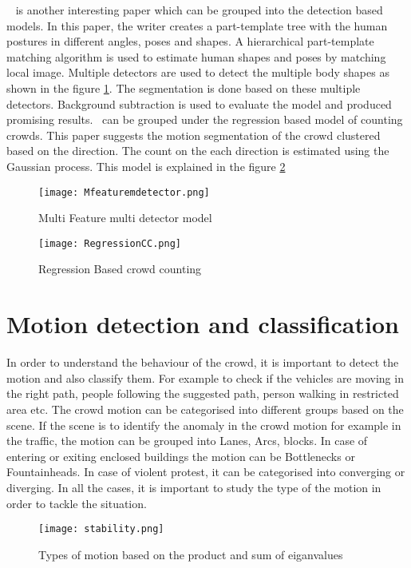 ~\cite{5374413} is another interesting paper which can be grouped into the detection based models. In 
this paper, the writer creates a part-template tree with the human postures in different angles, poses 
and shapes. A hierarchical part-template matching algorithm is used to estimate human shapes and 
poses by matching local image. Multiple detectors are used to detect the multiple body shapes as 
shown in the figure \ref{fig:rmfmdcc}. The segmentation is done based on these multiple detectors. 
Background subtraction is used to evaluate the model and produced promising 
results.~\cite{chan2008privacy} can be grouped under the regression based model of counting crowds. 
This paper suggests the motion segmentation of the crowd clustered based on the direction. The count 
on the each direction is estimated using the Gaussian process. This model is explained in the figure 
\ref{fig:regcc}

\begin{figure}[tb]
	\center\texttt{[image: Mfeaturemdetector.png]}
	\caption{Multi Feature multi detector model}
	\label{fig:rmfmdcc}
\end{figure}

\begin{figure}[tb]
	\center\texttt{[image: RegressionCC.png]}
	\caption{Regression Based crowd counting}
	\label{fig:regcc}
\end{figure}

\section{Motion detection and classification}
In order to understand the behaviour of the crowd, it is important to detect the motion and also classify 
them. For example to check if the vehicles are moving in the right path, people following the suggested 
path, person walking in restricted area etc. The crowd motion can be categorised into different groups 
based on the scene. If the scene is to identify the anomaly in the crowd motion for example in the traffic, 
the motion can be grouped into Lanes, Arcs, blocks. In case of entering or exiting enclosed buildings 
the motion can be Bottlenecks or Fountainheads. In case of violent protest, it can be categorised into 
converging or diverging. In all the cases, it is important to study the type of the motion in order to tackle 
the situation.

\begin{figure}[tb]
	\center\texttt{[image: stability.png]}
	\caption{Types of motion based on the product and sum of eiganvalues}
	\label{fig:stability}
\end{figure}

